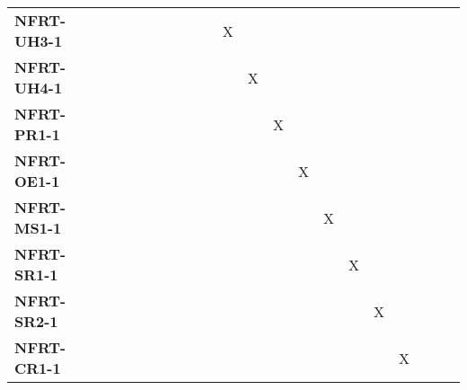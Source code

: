 \documentclass[12pt, titlepage]{article}
\begin{document}
\begin{landscape}
\begin{longtable}{|l|ccccccccccccccc|}
		\textbf{NFRT-UH3-1} & ~                                                         & ~            & ~            & ~            & ~            & X            & ~            & ~            & ~            & ~            & ~            & ~            & ~            & ~            & ~            \\
		\textbf{NFRT-UH4-1} & ~                                                         & ~            & ~            & ~            & ~            & ~            & X            & ~            & ~            & ~            & ~            & ~            & ~            & ~            & ~            \\
		\textbf{NFRT-PR1-1} & ~                                                         & ~            & ~            & ~            & ~            & ~            & ~            & X            & ~            & ~            & ~            & ~            & ~            & ~            & ~            \\
		\textbf{NFRT-OE1-1} & ~                                                         & ~            & ~            & ~            & ~            & ~            & ~            & ~            & X            & ~            & ~            & ~            & ~            & ~            & ~            \\
		\textbf{NFRT-MS1-1} & ~                                                         & ~            & ~            & ~            & ~            & ~            & ~            & ~            & ~            & X            & ~            & ~            & ~            & ~            & ~            \\
		\textbf{NFRT-SR1-1} & ~                                                         & ~            & ~            & ~            & ~            & ~            & ~            & ~            & ~            & ~            & X            & ~            & ~            & ~            & ~            \\
		\textbf{NFRT-SR2-1} & ~                                                         & ~            & ~            & ~            & ~            & ~            & ~            & ~            & ~            & ~            & ~            & X            & ~            & ~            & ~            \\
		\textbf{NFRT-CR1-1} & ~                                                         & ~            & ~            & ~            & ~            & ~            & ~            & ~            & ~            & ~            & ~            & ~            & X            & ~            & ~            \\

\end{longtable}
\end{landscape}
\end{document}
